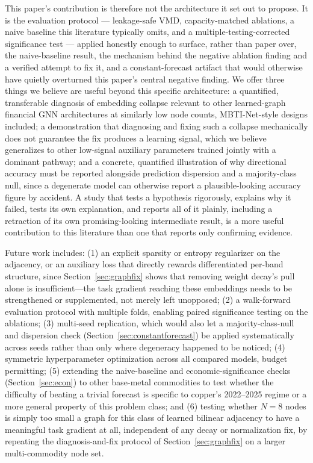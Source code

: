 \documentclass[journal]{IEEEtran}
\begin{document}
This paper's contribution is therefore not the architecture it set out to propose. It is the evaluation protocol --- leakage-safe VMD, capacity-matched ablations, a naive baseline this literature typically omits, and a multiple-testing-corrected significance test --- applied honestly enough to surface, rather than paper over, the naive-baseline result, the mechanism behind the negative ablation finding and a verified attempt to fix it, and a constant-forecast artifact that would otherwise have quietly overturned this paper's central negative finding. We offer three things we believe are useful beyond this specific architecture: a quantified, transferable diagnosis of embedding collapse relevant to other learned-graph financial GNN architectures at similarly low node counts, MBTI-Net-style designs included; a demonstration that diagnosing and fixing such a collapse mechanically does not guarantee the fix produces a learning signal, which we believe generalizes to other low-signal auxiliary parameters trained jointly with a dominant pathway; and a concrete, quantified illustration of why directional accuracy must be reported alongside prediction dispersion and a majority-class null, since a degenerate model can otherwise report a plausible-looking accuracy figure by accident. A study that tests a hypothesis rigorously, explains why it failed, tests its own explanation, and reports all of it plainly, including a retraction of its own promising-looking intermediate result, is a more useful contribution to this literature than one that reports only confirming evidence.

Future work includes: (1) an explicit sparsity or entropy regularizer on the adjacency, or an auxiliary loss that directly rewards differentiated per-band structure, since Section~\ref{sec:graphfix} shows that removing weight decay's pull alone is insufficient---the task gradient reaching these embeddings needs to be strengthened or supplemented, not merely left unopposed; (2) a walk-forward evaluation protocol with multiple folds, enabling paired significance testing on the ablations; (3) multi-seed replication, which would also let a majority-class-null and dispersion check (Section~\ref{sec:constantforecast}) be applied systematically across seeds rather than only where degeneracy happened to be noticed; (4) symmetric hyperparameter optimization across all compared models, budget permitting; (5) extending the naive-baseline and economic-significance checks (Section~\ref{sec:econ}) to other base-metal commodities to test whether the difficulty of beating a trivial forecast is specific to copper's 2022--2025 regime or a more general property of this problem class; and (6) testing whether $N=8$ nodes is simply too small a graph for this class of learned bilinear adjacency to have a meaningful task gradient at all, independent of any decay or normalization fix, by repeating the diagnosis-and-fix protocol of Section~\ref{sec:graphfix} on a larger multi-commodity node set.
\end{document}
